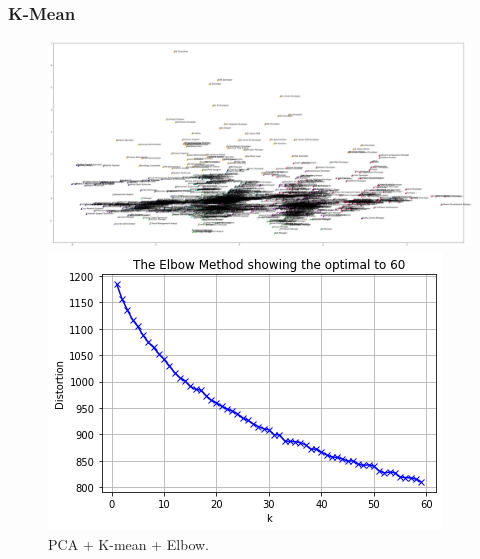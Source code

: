 \documentclass[10pt,mathserif]{beamer}
\begin{document}
	\begin{frame}
	\frametitle{K-Mean}
	\begin{figure}[h]
	
	\centering
	\begin{minipage}{.48\linewidth}
		\includegraphics[width=\linewidth]{./photos/clusterscatter.png}
		
		
	\end{minipage}
	\hfill
	\begin{minipage}{.48\linewidth}
		\includegraphics[width=.7\linewidth]{./photos/elbow.png}
		
		
	\end{minipage}
	\caption{PCA + K-mean + Elbow.}
	
\end{figure}
\end{frame}
\end{document}
